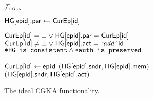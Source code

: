 \begin{figure*}[!tbp]
\begin{systembox}{\normalsize$\funcCGKA$}
{\begin{minipage}[t]{0.52\linewidth}
\begin{algorithmic}
      \State {}
         $\setvert[\hgnodeid].\hgpar\gets\ptr[\id]$
      \EndIf

      \State \KwAss{} $\ptr[\id]=\bot \lor \setvert[\hgnodeid].\hgpar = \ptr[\id]$
      \State \KwAss{} $\ptr[\id]\neq\bot \lor \setvert[\hgnodeid].\hgact = \hgla\md\id$
      \State {}
  		\State \KwAss{} $\hgConsistent \land \authPreserved$


      \State {}
      \State $\ptr[\id] \gets \hgnodeid$
         \Return $(\setvert[\hgnodeid].\hgorig,\setvert[\hgnodeid].\hgm)$
      \Else
        \ \Return $(\setvert[\hgnodeid].\hgorig,\setvert[\hgnodeid].\hgact)$
      \EndIf
    \end{algorithmic}

  \end{minipage}}


\end{systembox}
%

\caption{The ideal CGKA functionality.}\label{fig:CGKA-func-active}
\end{figure*}

